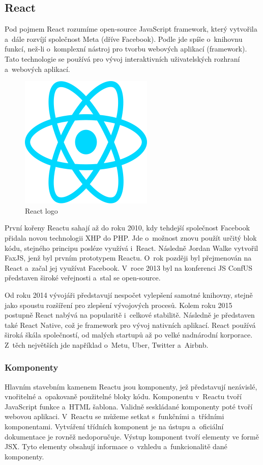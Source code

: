 \subsection{React}

Pod pojmem React rozumíme open-source JavaScript framework, který vytvořila a~dále rozvíjí společnost Meta (dříve Facebook). 
Podle \cite{reactbanks} jde spíše o~knihovnu funkcí, než-li o~komplexní nástroj pro tvorbu webových aplikací (framework). 
Tato technologie se používá pro vývoj interaktivních uživatelských rozhraní a~webových aplikací.\cite{reacthubspot}

\begin{figure}[htb]
	\centering
		\includegraphics[width=.3\textwidth]{images/react-logo.png}
	\caption[React logo]{React logo \cite{react}}
	\label{fig:reactlogo}
\end{figure}

První kořeny Reactu sahají až do roku 2010, kdy tehdejší společnost Facebook přidala novou technologii XHP do PHP. 
Jde o~možnost znovu použít určitý blok kódu, stejného principu posléze využívá i~React. Následně Jordan Walke vytvořil FaxJS, jenž byl prvním prototypem Reactu.
O~rok později byl přejmenován na React a~začal jej využívat Facebook. 
V~roce 2013 byl na konferenci JS ConfUS představen široké veřejnosti a~stal se open-source.

Od roku 2014 vývojáři představují nespočet vylepšení samotné knihovny, stejně jako spoustu rozšíření pro zlepšení vývojových procesů. 
Kolem roku 2015 postupně React nabývá na popularitě i~celkové stabilitě. Následně je představen také React Native, což je framework pro vývoj nativních aplikací.
React používá široká škála společností, od malých startupů až po velké nadnárodní korporace. 
Z~těch největších jde například o~Metu, Uber, Twitter a~Airbnb.\cite{reactbanks,reactrisingstack}

\subsubsection{Komponenty}

Hlavním stavebním kamenem Reactu jsou komponenty, jež představují nezávislé, vnořitelné a~opakovaně použitelné bloky kódu. 
Komponentu v~Reactu tvoří JavaScript funkce a~HTML šablona. Validně seskládané komponenty poté tvoří webovou aplikaci.
V~Reactu se můžeme setkat s~funkčními a~třídními komponentami. Vytváření třídních komponent je na ústupu a~oficiální dokumentace je rovněž nedoporučuje. 
Výstup komponent tvoří elementy ve formě JSX. Tyto elementy obsahují informace o~vzhledu a~funkcionalitě dané komponenty.

